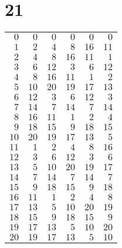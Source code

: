 \documentclass[a4paper]{scrartcl}
\begin{document}
\section*{21}
\begin{tabular}{rrrrrr}
\toprule
$0$ & $0$ & $0$ & $0$ & $0$ & $0$ \\
$1$ & $2$ & $4$ & $8$ & $16$ & $11$ \\
$2$ & $4$ & $8$ & $16$ & $11$ & $1$ \\
$3$ & $6$ & $12$ & $3$ & $6$ & $12$ \\
$4$ & $8$ & $16$ & $11$ & $1$ & $2$ \\
$5$ & $10$ & $20$ & $19$ & $17$ & $13$ \\
$6$ & $12$ & $3$ & $6$ & $12$ & $3$ \\
$7$ & $14$ & $7$ & $14$ & $7$ & $14$ \\
$8$ & $16$ & $11$ & $1$ & $2$ & $4$ \\
$9$ & $18$ & $15$ & $9$ & $18$ & $15$ \\
$10$ & $20$ & $19$ & $17$ & $13$ & $5$ \\
$11$ & $1$ & $2$ & $4$ & $8$ & $16$ \\
$12$ & $3$ & $6$ & $12$ & $3$ & $6$ \\
$13$ & $5$ & $10$ & $20$ & $19$ & $17$ \\
$14$ & $7$ & $14$ & $7$ & $14$ & $7$ \\
$15$ & $9$ & $18$ & $15$ & $9$ & $18$ \\
$16$ & $11$ & $1$ & $2$ & $4$ & $8$ \\
$17$ & $13$ & $5$ & $10$ & $20$ & $19$ \\
$18$ & $15$ & $9$ & $18$ & $15$ & $9$ \\
$19$ & $17$ & $13$ & $5$ & $10$ & $20$ \\
$20$ & $19$ & $17$ & $13$ & $5$ & $10$ \\
\bottomrule
\end{tabular}
\end{document}

